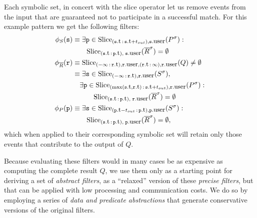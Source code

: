 Each symbolic set, in concert with the slice operator let us remove events from
the input that are guaranteed not to participate in a successful match.
For this example pattern we get the following filters:
\begin{align*}
\precs{S}(\symv{s}) 
&\equiv  
\exists \symv{p} \in 
\slice{\syms{P}}
      {(\facc{\symv{s}}{t}\,:\,\facc{\symv{s}}{t} + t_{out}),
       \facc{\symv{s}}{user}} :\ 
\\
&\qquad
\slice{\syms{\oR}}
      {(\facc{\symv{s}}{t}\,:\,\facc{\symv{p}}{t}),\; \facc{\symv{s}}{user}}
 = \emptyset 
\\
\precs{\oR}(\symv{r}) 
&\equiv
\slice{Q}
      {(-\infty\,:\,\facc{\symv{r}}{t}), 
      	\facc{\symv{r}}{user}, 
       (\facc{\symv{r}}{t}\,:\,\infty), 
       \facc{\symv{r}}{user}} 
\neq \emptyset 
\\
&\equiv
\exists \symv{s} \in 
\slice{\syms{S}}{(-\infty\,:\,\facc{\symv{r}}{t}), \facc{\symv{r}}{user}},
\\
&\quad
\exists \symv{p} \in 
\slice{\syms{P}}
{(\max(\facc{\symv{s}}{t},\facc{\symv{r}}{t})\,:\,\facc{\symv{s}}{t} + t_{out}),
	\facc{\symv{r}}{user}}
: 
\\ 
&\qquad\quad
\slice{\syms{\oR}}
{(\facc{\symv{s}}{t}\,:\,\facc{\symv{p}}{t}),\; \facc{\symv{r}}{user}} 
= \emptyset  
\\
\precs{P}(\symv{p}) 
&\equiv  
\exists \symv{s} \in 
\slice{\syms{S}}
      {(\facc{\symv{p}}{t} - t_{out}\,:\,\facc{\symv{p}}{t}),  
       \facc{\symv{p}}{user}} :\
\\
&\qquad
\slice{\syms{\oR}}
      {(\facc{\symv{s}}{t}\,:\,\facc{\symv{p}}{t}),\; \facc{\symv{p}}{user}}
= \emptyset,
\end{align*}
which when applied to their corresponding symbolic set will retain only those 
events that contribute to the output of $Q$. 

Because evaluating these filters would in many cases be as expensive as computing
the complete result $Q$, we use them only as a starting point for deriving a set
of {\em abstract filters}, as a ``relaxed'' version of these
{\em precise filters}, but that can be applied with low processing and 
communication costs.
We do so by employing a series of {\em data and predicate abstractions} 
that generate conservative versions of the original filters.

